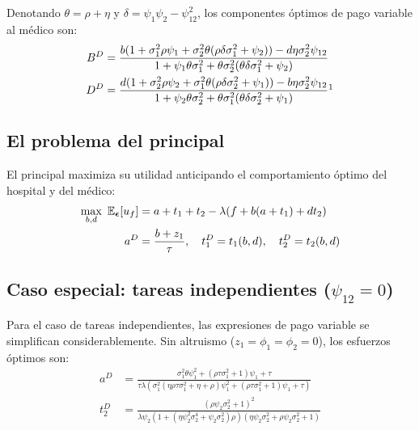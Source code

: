 Denotando $\theta=\rho+\eta$ y $\delta=\psi_1\psi_2-\psi_{12}^2$, los componentes óptimos de pago variable al médico son:
\begin{align}
  B^D &= \frac{b(1+\sigma_1^2\rho\psi_1+\sigma_2^2\theta(\rho\delta\sigma_1^2+\psi_2))-d\eta\sigma_2^2\psi_{12}}{1+\psi_1\theta\sigma_1^2+\theta\sigma_2^2(\theta\delta\sigma_1^2+\psi_2)} \label{eq:BD}\\
  D^D &= \frac{d(1+\sigma_2^2\rho\psi_2+\sigma_1^2\theta(\rho\delta\sigma_2^2+\psi_1))-b\eta\sigma_2^2\psi_{12}}{1+\psi_2\theta\sigma_2^2+\theta\sigma_1^2(\theta\delta\sigma_2^2+\psi_1)} \label{eq:DD}\footnotemark
\end{align}

\subsection{El problema del principal}

El principal maximiza su utilidad anticipando el comportamiento óptimo del hospital y del médico:
\begin{align*}
  \max_{b,d}\ \mathbb{E}_{\bm{\epsilon}}[u_f] &= a+t_1+t_2-\lambda(f+b(a+t_1)+dt_2)\\
  a^D &= \frac{b+z_1}{\tau}, \quad t_1^D = t_1(b,d), \quad t_2^D = t_2(b,d)
\end{align*}

\subsection{Caso especial: tareas independientes (\texorpdfstring{$\psi_{12}=0$}{psi\_12=0})}

Para el caso de tareas independientes, las expresiones de pago variable se simplifican considerablemente. Sin altruismo ($z_1=\phi_1=\phi_2=0$), los esfuerzos óptimos son:
\begin{align}
  a^D &= \frac{\sigma_1^2\theta\psi_1^2+(\rho\tau\sigma_1^2+1)\psi_1+\tau}{\tau\lambda(\sigma_1^2(\eta\rho\tau\sigma_1^2+\eta+\rho)\psi_1^2+(\rho\tau\sigma_1^2+1)\psi_1+\tau)} \label{eq:aD_indep}\\
  t_2^D &= \frac{(\rho\psi_2\sigma_2^2+1)^2}{\lambda\psi_2(1+(\eta\psi_2^2\sigma_2^4+\psi_2\sigma_2^2)\rho)(\eta\psi_2\sigma_2^2+\rho\psi_2\sigma_2^2+1)} \label{eq:t2D_indep}
\end{align}

